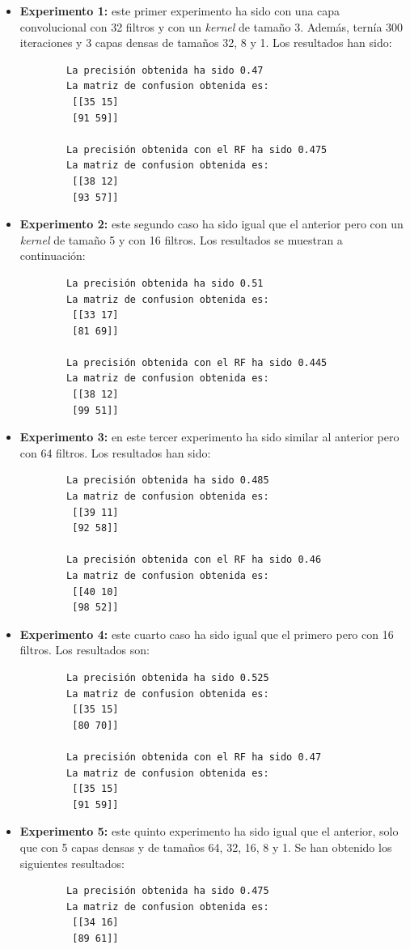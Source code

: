 \begin{itemize}
    \item \textbf{Experimento 1:} este primer experimento ha sido con una capa convolucional con 32 filtros y con un \emph{kernel} de tamaño 3. Además, ternía 300 iteraciones y 3 capas densas de tamaños 32, 8 y 1. Los resultados han sido:
    \begin{verbatim}
        La precisión obtenida ha sido 0.47
        La matriz de confusion obtenida es:
         [[35 15]
         [91 59]]
        
        La precisión obtenida con el RF ha sido 0.475
        La matriz de confusion obtenida es:
         [[38 12]
         [93 57]]
    \end{verbatim}
    \item \textbf{Experimento 2:} este segundo caso ha sido igual que el anterior pero con un \emph{kernel} de tamaño 5 y con 16 filtros. Los resultados se muestran a continuación:
    \begin{verbatim}
        La precisión obtenida ha sido 0.51
        La matriz de confusion obtenida es:
         [[33 17]
         [81 69]]
        
        La precisión obtenida con el RF ha sido 0.445
        La matriz de confusion obtenida es:
         [[38 12]
         [99 51]]
    \end{verbatim}
    \item \textbf{Experimento 3:} en este tercer experimento ha sido similar al anterior pero con 64 filtros. Los resultados han sido:
    \begin{verbatim}
        La precisión obtenida ha sido 0.485
        La matriz de confusion obtenida es:
         [[39 11]
         [92 58]]
        
        La precisión obtenida con el RF ha sido 0.46
        La matriz de confusion obtenida es:
         [[40 10]
         [98 52]]
    \end{verbatim}
    \item \textbf{Experimento 4:} este cuarto caso ha sido igual que el primero pero con 16 filtros. Los resultados son:
    \begin{verbatim}
        La precisión obtenida ha sido 0.525
        La matriz de confusion obtenida es:
         [[35 15]
         [80 70]]
        
        La precisión obtenida con el RF ha sido 0.47
        La matriz de confusion obtenida es:
         [[35 15]
         [91 59]]
    \end{verbatim}
    \item \textbf{Experimento 5:} este quinto experimento ha sido igual que el anterior, solo que con 5 capas densas y de tamaños 64, 32, 16, 8 y 1. Se han obtenido los siguientes resultados:
    \begin{verbatim}
        La precisión obtenida ha sido 0.475
        La matriz de confusion obtenida es:
         [[34 16]
         [89 61]]
        

\end{verbatim}
\end{itemize}
